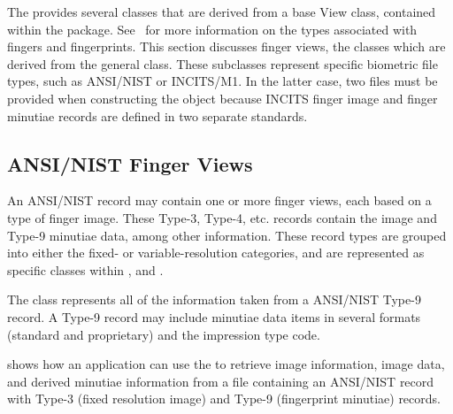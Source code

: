 The \sname provides several classes that are derived from a base View class,
contained within the  package. See~ for
more information
on the types associated with fingers and fingerprints. This section discusses
finger views, the classes which are derived from the general  class.
These subclasses represent specific biometric file types, such as ANSI/NIST
or INCITS/M1. In the latter case, two files must be provided when constructing
the object because INCITS finger image and finger minutiae records are defined
in two separate standards.

\subsection{ANSI/NIST Finger Views}

An ANSI/NIST record may contain one or more finger views, each based on a type
of finger image. These Type-3, Type-4, etc. records contain the image and
Type-9 minutiae data, among other information. These record types are grouped
into either the fixed- or variable-resolution categories, and are represented
as specific classes within \sname,  and
.

The  class represents all of the information taken
from a ANSI/NIST Type-9 record. A Type-9 record may include minutiae data items
in several formats (standard and proprietary) and the impression type code.

 shows how an application can use the
 to retrieve image information, image data, and
derived minutiae information from a file containing an ANSI/NIST record with
Type-3 (fixed resolution image) and Type-9 (fingerprint minutiae) records.

